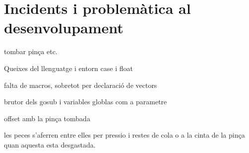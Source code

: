 \section{Incidents i problemàtica al desenvolupament}

tombar pinça etc.

Queixes del llenguatge i entorn
case i float

falta de macros, sobretot per declaració de vectors

brutor dels gosub i variables globlas com a parametre

offset amb la pinça tombada

les peces s'aferren entre elles per pressio i restes de cola o a la cinta de la pinça quan aquesta esta desgastada.